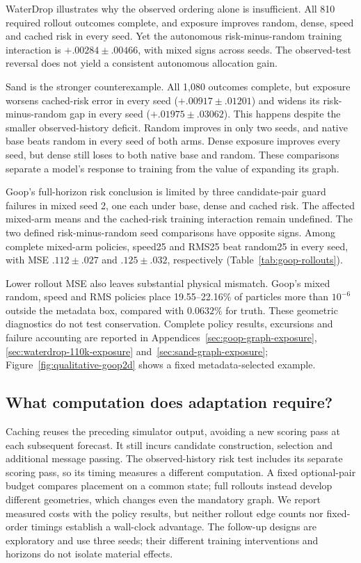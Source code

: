 WaterDrop illustrates why the observed ordering alone is insufficient. All 810 required rollout outcomes complete, and exposure improves random, dense, speed and cached risk in every seed. Yet the autonomous risk-minus-random training interaction is $+.00284\pm.00466$, with mixed signs across seeds. The observed-test reversal does not yield a consistent autonomous allocation gain.

Sand is the stronger counterexample. All 1,080 outcomes complete, but exposure worsens cached-risk error in every seed ($+.00917\pm.01201$) and widens its risk-minus-random gap in every seed ($+.01975\pm.03062$). This happens despite the smaller observed-history deficit. Random improves in only two seeds, and native base beats random in every seed of both arms. Dense exposure improves every seed, but dense still loses to both native base and random. These comparisons separate a model's response to training from the value of expanding its graph.

Goop's full-horizon risk conclusion is limited by three candidate-pair guard failures in mixed seed 2, one each under base, dense and cached risk. The affected mixed-arm means and the cached-risk training interaction remain undefined. The two defined risk-minus-random seed comparisons have opposite signs. Among complete mixed-arm policies, speed25 and RMS25 beat random25 in every seed, with MSE $.112\pm.027$ and $.125\pm.032$, respectively (Table~\ref{tab:goop-rollouts}).


Lower rollout MSE also leaves substantial physical mismatch. Goop's mixed random, speed and RMS policies place 19.55--22.16\% of particles more than $10^{-6}$ outside the metadata box, compared with $0.0632\%$ for truth. These geometric diagnostics do not test conservation. Complete policy results, excursions and failure accounting are reported in Appendices~\ref{sec:goop-graph-exposure}, \ref{sec:waterdrop-110k-exposure} and~\ref{sec:sand-graph-exposure}; Figure~\ref{fig:qualitative-goop2d} shows a fixed metadata-selected example.

\subsection{What computation does adaptation require?}
Caching reuses the preceding simulator output, avoiding a new scoring pass at each subsequent forecast. It still incurs candidate construction, selection and additional message passing. The observed-history risk test includes its separate scoring pass, so its timing measures a different computation. A fixed optional-pair budget compares placement on a common state; full rollouts instead develop different geometries, which changes even the mandatory graph. We report measured costs with the policy results, but neither rollout edge counts nor fixed-order timings establish a wall-clock advantage. The follow-up designs are exploratory and use three seeds; their different training interventions and horizons do not isolate material effects.
